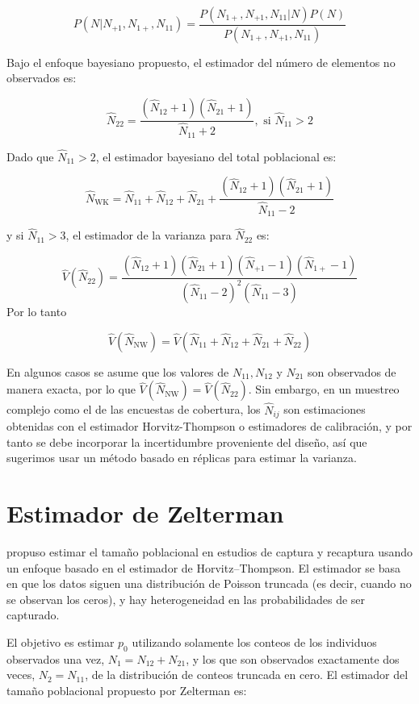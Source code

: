 \documentclass[
  12pt,
]{book}
\begin{document}
\[P(N|N_{+1}, N_{1+}, N_{11}) = \frac{P(N_{1+}, N_{+1}, N_{11}|N)P(N)}{P(N_{1+}, N_{+1}, N_{11})}\]

Bajo el enfoque bayesiano propuesto, el estimador del número de elementos no observados es:

\[\hat{N}_{22} = \frac{(\hat{N}_{12}+1)(\hat{N}_{21}+1)}{\hat{N}_{11} + 2}, \text{  si } \hat{N}_{11} > 2\]

Dado que \(\hat{N}_{11} > 2\), el estimador bayesiano del total poblacional es:

\[
\hat{N}_{\text{WK}} = \hat{N}_{11} + \hat{N}_{12} + \hat{N}_{21} + \frac{(\hat{N}_{12} + 1)(\hat{N}_{21} + 1)}{\hat{N}_{11} - 2}\]

y si \(\hat{N}_{11} > 3\), el estimador de la varianza para \(\hat{N}_{\text{22}}\) es:

\[\hat{V}(\hat{N}_{\text{22}}) = \frac{(\hat{N}_{12} + 1)(\hat{N}_{21} + 1)(\hat{N}_{+1} - 1)(\hat{N}_{1+} - 1)}{(\hat{N}_{11} - 2)^2(\hat{N}_{11} - 3)}\]
Por lo tanto

\[\hat{V}(\hat{N}_{\text{NW}}) = \hat{V}(\hat{N}_{11} + \hat{N}_{12} + \hat{N}_{21} + \hat{N}_{22})\]

En algunos casos se asume que los valores de \(N_{11}, N_{12}\) y \(N_{21}\) son observados de manera exacta, por lo que \(\hat{V}(\hat{N}_{\text{NW}}) = \hat{V}(\hat{N}_{22})\). Sin embargo, en un muestreo complejo como el de las encuestas de cobertura, los \(\hat{N}_{ij}\) son estimaciones obtenidas con el estimador Horvitz-Thompson o estimadores de calibración, y por tanto se debe incorporar la incertidumbre proveniente del diseño, así que sugerimos usar un método basado en réplicas para estimar la varianza.

\section{Estimador de Zelterman}\label{estimador-de-zelterman}

\citet{zelterman1988robust} propuso estimar el tamaño poblacional en estudios de captura y recaptura usando un enfoque basado en el estimador de Horvitz--Thompson. El estimador se basa en que los datos siguen una distribución de Poisson truncada (es decir, cuando no se observan los ceros), y hay heterogeneidad en las probabilidades de ser capturado.

El objetivo es estimar \(p_0\) utilizando solamente los conteos de los individuos observados una vez, \(N_{1}=N_{12}+N_{21}\), y los que son observados exactamente dos veces, \(N_{2}=N_{11}\), de la distribución de conteos truncada en cero. El estimador del tamaño poblacional propuesto por Zelterman es:
\end{document}
